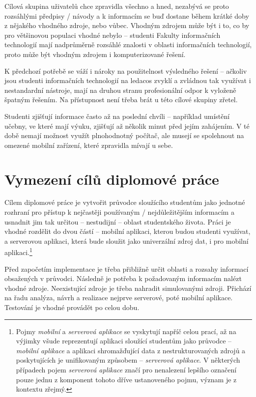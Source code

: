 Cílová skupina uživatelů chce zpravidla všechno a hned, nezabývá se proto rozsáhlými předpisy / návody a k informacím se buď dostane během krátké doby z nějakého vhodného zdroje, nebo vůbec. Vhodným zdrojem může být i to, co by pro většinovou populaci vhodné nebylo -- studenti Fakulty informačních technologií mají nadprůměrně rozsáhlé znalosti v oblasti informačních technologií, proto může být vhodným zdrojem i komputerizované řešení.

K předchozí potřebě se váží i nároky na použitelnost výsledného řešení -- ačkoliv jsou studenti informačních technologií na ledacos zvyklí a zvládnou tak využívat i nestandardní nástroje, mají na druhou stranu profesionální odpor k vyloženě špatným řešením. Na přístupnost není třeba brát u této cílové skupiny zřetel. 

Studenti zjišťují informace často až na poslední chvíli -- například umístění učebny, ve které mají výuku, zjišťují až několik minut před jejím zahájením. V té době nemají možnost využít plnohodnotný počítač, ale musejí se spolehnout na omezené mobilní zařízení, které zpravidla mívají u sebe.

\section{Vymezení cílů diplomové práce}
Cílem diplomové práce je vytvořit průvodce sloužícího studentům jako jednotné rozhraní pro přístup k nejčastěji používaným / nejdůležitějším informacím a usnadnit jim tak určitou -- nestudijní -- oblast studentského života. Práci je vhodné rozdělit do dvou částí -- mobilní aplikaci, kterou budou studenti využívat, a serverovou aplikaci, která bude sloužit jako univerzální zdroj dat, i pro mobilní aplikaci.\footnote{\label{fnt:aplikace} Pojmy \textit{mobilní} a \textit{serverová aplikace} se vyskytují napříč celou prací, až na výjimky všude reprezentují aplikaci sloužící studentům jako průvodce -- \textit{mobilní aplikace} a aplikaci shromažďující data z nestrukturovaných zdrojů a poskytujících je unifikovaným způsobem -- \textit{serverová aplikace}. V některých případech pojem \textit{serverová aplikace} značí pro nenalezení lepšího označení pouze jednu z komponent tohoto dříve ustanoveného pojmu, význam je z kontextu zřejmý.}

Před započetím implementace je třeba přibližně určit oblasti a rozsahy informací obsažených v průvodci. Následně je potřeba k požadovaným informacím nalézt vhodné zdroje. Neexistující zdroje je třeba nahradit simulovanými zdroji. Přichází na řadu analýza, návrh a realizace nejprve serverové, poté mobilní aplikace. Testování je vhodné provádět po celou dobu.

